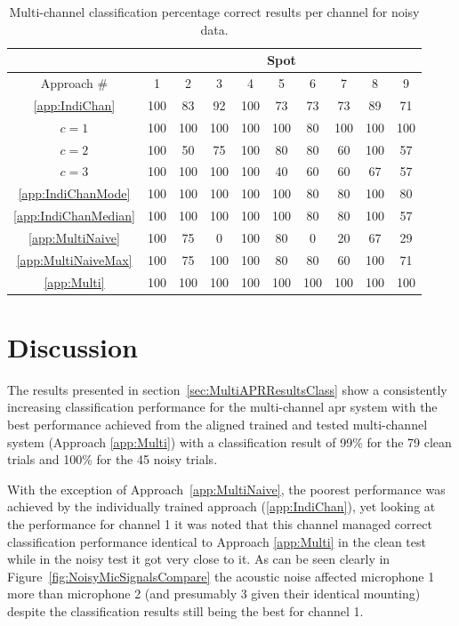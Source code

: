 \begin{table}\begin{center}
\caption{Multi-channel classification percentage correct results per channel for noisy data.}
\label{tab:multiAPRresultsNoisePerChan}
\begin{tabular}{|c|c|c|c|c|c|c|c|c|c|}\hline
  & \multicolumn{9}{|c|}{Spot} \\
\hline
Approach \#             & 1   & 2   & 3   & 4   & 5   & 6   & 7   & 8   & 9  \\ \hline
\ref{app:IndiChan}      & 100 &  83 &  92 & 100 &  73 &  73 &  73 &  89 &  71  \\
$c = 1$                 & 100 & 100 & 100 & 100 & 100 &  80 & 100 & 100 & 100  \\
$c = 2$                 & 100 &  50 &  75 & 100 &  80 &  80 &  60 & 100 &  57  \\
$c = 3$                 & 100 & 100 & 100 & 100 &  40 &  60 &  60 &  67 &  57  \\
\ref{app:IndiChanMode}  & 100 & 100 & 100 & 100 & 100 &  80 &  80 & 100 &  80  \\
\ref{app:IndiChanMedian}& 100 & 100 & 100 & 100 & 100 &  80 &  80 & 100 &  57  \\
\ref{app:MultiNaive}    & 100 &  75 &   0 & 100 &  80 &   0 &  20 &  67 &  29  \\
\ref{app:MultiNaiveMax} & 100 &  75 & 100 & 100 &  80 &  80 &  60 & 100 &  71  \\
\ref{app:Multi}         & 100 & 100 & 100 & 100 & 100 & 100 & 100 & 100 & 100  \\ \hline
\end{tabular}\end{center}\end{table}


\section{Discussion}
The results presented in section~\ref{sec:MultiAPRResultsClass} show a consistently increasing classification performance for the multi-channel \gls{apr} system with the best performance achieved from the aligned trained and tested multi-channel system (Approach \ref{app:Multi}) with a classification result of 99\% for the 79 clean trials and 100\% for the 45 noisy trials.

With the exception of Approach~\ref{app:MultiNaive}, the poorest performance was achieved by the individually trained approach (\ref{app:IndiChan}), yet looking at the performance for channel 1 it was noted that this channel managed correct classification performance identical to Approach \ref{app:Multi} in the clean test while in the noisy test it got very close to it. As can be seen clearly in Figure~\ref{fig:NoisyMicSignalsCompare} the acoustic noise affected microphone 1 more than microphone 2 (and presumably 3 given their identical mounting) despite the classification results still being the best for channel 1.

